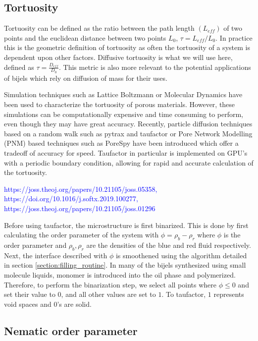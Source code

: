 \subsection{Tortuosity}

Tortuosity can be defined as the ratio between the path length $(L_{eff})$ of two points and the euclidean distance between two points $L_{0}$, $\tau = L_{eff}/L_{0}$. In practice this is the geometric definition of tortuosity as often the tortuosity of a system is dependent upon other factors. Diffusive tortuosity is what we will use here, defined as $\tau = \frac{D_{eff}}{D_0}$. This metric is also more relevant to the potential applications of bijels which rely on diffusion of mass for their uses.

Simulation techniques such as Lattice Boltzmann or Molecular Dynamics have been used to characterize the tortuosity of porous materials. However, these simulations can be computationally expensive and time consuming to perform, even though they may have great accuracy. Recently, particle diffusion techniques based on a random walk such as pytrax and taufactor or Pore Network Modelling (PNM) based techniques such as PoreSpy have been introduced which offer a tradeoff of accuracy for speed. Taufactor in particular is implemented on GPU's with a periodic boundary condition, allowing for rapid and accurate calculation of the tortuosity.

\textcolor{blue}{https://joss.theoj.org/papers/10.21105/joss.05358, https://doi.org/10.1016/j.softx.2019.100277, https://joss.theoj.org/papers/10.21105/joss.01296}

Before using taufactor, the microstructure is first binarized. This is done by first calculating the order parameter of the system with $\phi = \rho_b - \rho_r$ where $\phi$ is the order parameter and $\rho_b, \rho_r$ are the densities of the blue and red fluid respectively. Next, the interface described with $\phi$ is smoothened using the algorithm detailed in section \ref{section:filling_routine}. In many of the bijels synthesized using small molecule liquids, monomer is introduced into the oil phase and polymerized. Therefore, to perform the binarization step, we select all points where $\phi \leq 0$ and set their value to $0$, and all other values are set to $1$. To taufactor, $1$ represents void spaces and 0's are solid. 

\subsection{Nematic order parameter}

